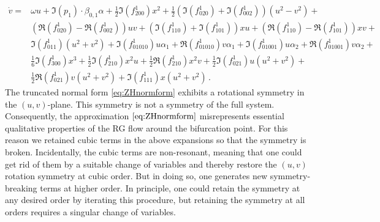 \begin{subappendices}
\begin{equation}
\begin{aligned}
    \dot v ={}&   \omega u +  \Im (p_1) \cdot \beta_{0,1}\alpha+ \frac12 \Im(f^1_{200}) x^2 + \frac12 (\Im(f^1_{020}) +  \Im(f^1_{002})) (u^2-v^2) + \\ 
                    & (\Re(f^1_{020}) -  \Re(f^1_{002})) u v + (\Im(f^1_{110}) +  \Im(f^1_{101})) x u + (\Re(f^1_{110}) - \Re(f^1_{101})) x v + \\
                    & \Im(f^1_{011}) (u^2+v^2) + \Im(f^1_{01010}) u \alpha_1 + \Re(f^1_{01010}) v \alpha_1 + \Im(f^1_{01001}) u \alpha_2 + \Re(f^1_{01001}) v \alpha_2 +  \\
                    & \frac16 \Im(f^1_{300}) x^3 + \frac12 \Im(f^1_{210}) x^2 u + \frac12 \Re(f^1_{210}) x^2 v + \frac12 \Im(f^1_{021}) u (u^2+v^2) + \\
                    & \frac12 \Re(f^1_{021}) v (u^2+v^2) + \Im(f^1_{111}) x (u^2+v^2)\,.
\end{aligned}
\end{equation}
The truncated normal form \cref{eq:ZHnormform} exhibits a rotational symmetry in the $(u,v)$-plane. This symmetry is not a symmetry of the full system. Consequently, the approximation $\cref{eq:ZHnormform}$ misrepresents essential qualitative properties of the RG flow around the bifurcation point. For this reason we retained cubic terms in the above expansions so that the symmetry is broken. Incidentally, the cubic terms are non-resonant, meaning that one could get rid of them by a suitable change of variables and thereby restore the $(u,v)$ rotation symmetry at cubic order.  But in doing so, one generates new symmetry-breaking terms at higher order. In principle, one could retain the symmetry at any desired order by iterating this procedure, but retaining the symmetry at all orders requires a singular change of variables.
\end{subappendices}

